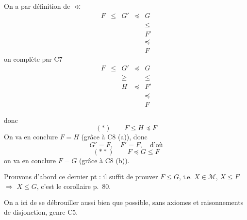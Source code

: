 \documentclass[11pt,a4paper]{article}
\begin{document}
On a par définition de $\ll$
\[
  \begin{array}{ccccc}
    F & \leq & G' & \preccurlyeq & G \\
      &      &    &              & \leq \\
      &      &    &              & F' \\
      &      &    &              & \preccurlyeq \\
      &      &    &              & F
  \end{array}
\]
on complète par C7
\[
  \begin{array}{ccccc}
    F & \leq & G' & \preccurlyeq & G \\
      &      & \geq &            & \leq \\
      &      & H & \preccurlyeq & F' \\
      &      &   &              & \preccurlyeq \\
      &      &   &              & F
  \end{array}
\]

\struck{\ill{}} donc
\[
  (*) \qquad F \leq H \preccurlyeq F
\]
On va en conclure $F = H$ (grâce à C8 (a)), donc
\[
  G' = F , \quad F' = F , \quad \text{d'où}
\]
\[
  (**) \qquad F \preccurlyeq G \leq F
\]
on va en conclure $F = G$ (grâce à C8 (b)).


Prouvons d'abord ce dernier pt : il  suffit de prouver $F \leq G$, i.e. \struck{\ill{}} $X \in \mathcal{M}$, $X \leq F$ $\Longrightarrow$ $X \leq G$, c'est \ill{} \ill{} le corollaire p.~80.


On a  ici de se débrouiller aussi bien que possible, sans axiomes et raisonnements de disjonction, genre C5.
\end{document}
